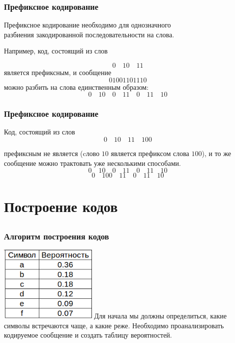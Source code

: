 \documentclass[10pt,pdf,hyperref={unicode}]{beamer}
\begin{document}
	\begin{frame}[t]\frametitle{Префиксное кодирование}
		Префиксное кодирование необходимо для однозначного\\
		разбиения закодированной последовательности на слова.

		Например, код, состоящий из слов 

		$$
			0 \quad 10 \quad 11 
		$$
		является префиксным, и сообщение 
		$$01001101110 $$
		можно разбить на слова единственным образом:
		$$
			0\quad10\quad0\quad11\quad0\quad11\quad10
		$$
	\end{frame}

	\begin{frame}[t]\frametitle{Префиксное кодирование}
		Код, состоящий из слов 
		$$
			0\quad10\quad11\quad100
		$$

		префиксным не является (cлово $10$ является префиксом слова $100$), и то же сообщение можно трактовать уже несколькими способами.
		$$
			0\quad10\quad0\quad11\quad0\quad11\quad10
		$$$$
			0\quad100\quad11\quad0\quad11\quad10
		$$
	\end{frame}

\section{Построение кодов}
\subsection{}

	\begin{frame}[t]
		\frametitle{Алгоритм построения кодов}
		\includegraphics[height=10em]{alg0.png}
		\vspace{1em}
		\newline
		Для начала мы должны определиться, какие символы встречаются чаще, а какие реже.
		Необходимо проанализировать кодируемое сообщение и создать таблицу вероятностей.\\

	\end{frame}
\end{document}
